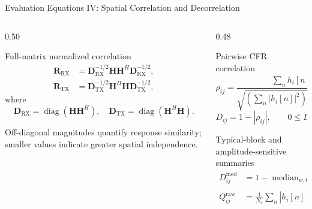 \begin{frame}[t]{Evaluation Equations IV: Spatial Correlation and Decorrelation}
  \scriptsize
  \begin{columns}[T,onlytextwidth]
    \begin{column}{0.50\textwidth}
      \begin{block}{Full-matrix normalized correlation}
        \begin{align*}
          \mathbf R_{\mathrm{RX}}
          &=\mathbf D_{\mathrm{RX}}^{-1/2}
            \mathbf H\mathbf H^H
            \mathbf D_{\mathrm{RX}}^{-1/2},\\
          \mathbf R_{\mathrm{TX}}
          &=\mathbf D_{\mathrm{TX}}^{-1/2}
            \mathbf H^H\mathbf H
            \mathbf D_{\mathrm{TX}}^{-1/2},
        \end{align*}
        where
        \begin{equation*}
          \mathbf D_{\mathrm{RX}}=\operatorname{diag}(\mathbf H\mathbf H^H),
          \quad
          \mathbf D_{\mathrm{TX}}=\operatorname{diag}(\mathbf H^H\mathbf H).
        \end{equation*}
      \end{block}

      Off-diagonal magnitudes quantify response similarity; smaller values
      indicate greater spatial independence.
    \end{column}

    \begin{column}{0.48\textwidth}
      \begin{block}{Pairwise CFR correlation}
        \begin{equation*}
          \rho_{ij}=\frac{\sum_n h_i[n]h_j^*[n]}
          {\sqrt{\left(\sum_n|h_i[n]|^2\right)
          \left(\sum_n|h_j[n]|^2\right)}}
        \end{equation*}
        \vspace{-1.5ex}
        \begin{equation*}
          D_{ij}=1-|\rho_{ij}|,\qquad 0\leq D_{ij}\leq1
        \end{equation*}
      \end{block}

      \begin{block}{Typical-block and amplitude-sensitive summaries}
        \begin{align*}
          D_{ij}^{\mathrm{med}}
            &=1-\operatorname{median}_{w,t}|\rho_{ij}^{(w,t)}|,\\
          Q_{ij}^{\mathrm{raw}}
            &=\frac{1}{N_s}\sum_n|h_i[n]-h_j[n]|^2.
        \end{align*}
      \end{block}
    \end{column}
  \end{columns}

\end{frame}


